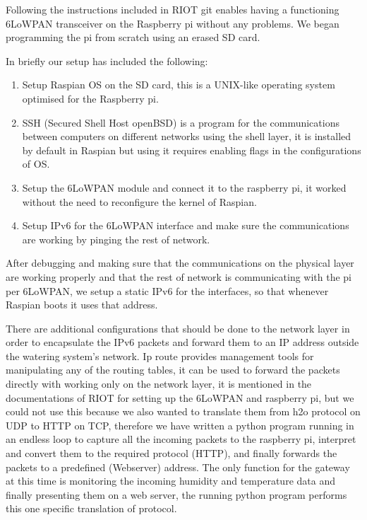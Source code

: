 \documentclass[11pt,paper=a4,parskip=half]{scrartcl}
\begin{document}
Following the instructions included in RIOT git \cite{riot_lowpan} enables having
a functioning 6LoWPAN transceiver on the Raspberry pi without any problems. We
began programming the pi from scratch using an erased SD card.

In briefly our setup has included the following:
\begin{enumerate}
	\item Setup Raspian OS on the SD card, this is a UNIX-like operating system optimised for the Raspberry pi.
	\item SSH (Secured Shell Host  openBSD) is a program for the communications between computers on different networks using the shell layer, it is installed by default in Raspian but using it requires enabling flags in the configurations of OS.
	\item Setup the 6LoWPAN module and connect it to the raspberry pi, it worked without the need to reconfigure the kernel of Raspian.
	\item Setup IPv6 for the 6LoWPAN interface and make sure the communications are working by pinging the rest of network.
\end{enumerate}

 After debugging and making sure that the communications on the physical layer
 are working properly and that the rest of network is communicating with the pi
 per 6LoWPAN, we setup a static IPv6 for the interfaces, so that whenever Raspian boots
 it uses that address.

 There are additional configurations that should be done to the network layer in
 order to encapsulate the IPv6 packets and forward them to an IP address
 outside the watering system's network. Ip route provides management tools for
 manipulating any of the routing tables, it can be used to forward the packets
 directly with working only on the network layer, it is mentioned in the
 documentations of RIOT for setting up the 6LoWPAN and raspberry pi, but we could
 not use this because we also wanted to translate them from h2o protocol
 on UDP to HTTP on TCP, therefore we have written a python
 program running in an endless loop to capture all the incoming packets to the
 raspberry pi, interpret and convert them to the required protocol (HTTP), and
 finally forwards the packets to a predefined (Webserver) address. The only
 function for the gateway at this time is monitoring the incoming humidity and
 temperature data and finally presenting them on a web server, the running
 python program performs this one specific translation of protocol.
\end{document}
